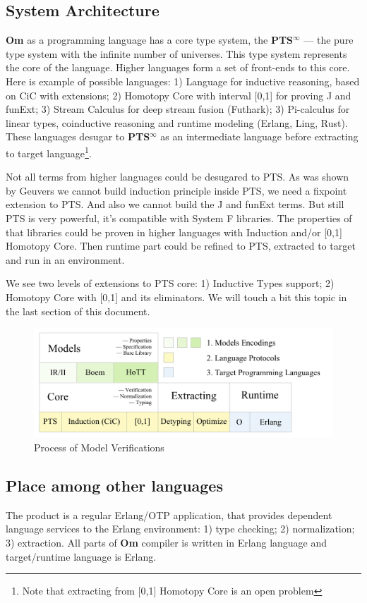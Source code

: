 \documentclass{aip-cp}
\begin{document}
\subsection{System Architecture}
{\bf Om} as a programming language
has a core type system, the {\bf PTS$^{\infty}$} --- the pure type system with the infinite number of universes.
This type system represents the core of the language. Higher languages form a set of
front-ends to this core. Here is example of possible languages:
1) Language for inductive reasoning, based on CiC with extensions;
2) Homotopy Core with interval [0,1] for proving J and funExt;
3) Stream Calculus for deep stream fusion (Futhark);
3) Pi-calculus for linear types, coinductive reasoning and runtime modeling (Erlang, Ling, Rust).
These languages desugar to {\bf PTS$^{\infty}$} as an intermediate language before
extracting to target language\footnote{Note that extracting from [0,1] Homotopy Core is an open problem}.

Not all terms from higher languages could be desugared to PTS. As was shown by
Geuvers\cite{Geuvers01} we cannot build induction principle inside PTS,
we need a fixpoint extension to PTS. And also we cannot build the J and funExt terms.
But still PTS is very powerful, it's compatible with System F libraries.
The properties of that libraries could be proven in higher languages
with Induction and/or [0,1] Homotopy Core. Then runtime part could be refined
to PTS, extracted to target and run in an environment.

We see two levels of extensions to PTS core: 1) Inductive Types support;
2) Homotopy Core with [0,1] and its eliminators. We will touch a bit this
topic in the last section of this document.

\begin{figure}[h]
  \centerline{\includegraphics[scale=0.28]{static}}
  \caption{Process of Model Verifications}
\end{figure}

\subsection{Place among other languages}
The product is a regular Erlang/OTP application,
that provides dependent language services to the Erlang environment:
1) type checking; 2) normalization; 3) extraction. All parts of {\bf Om}
compiler is written in Erlang language and target/runtime language is Erlang.
\end{document}
